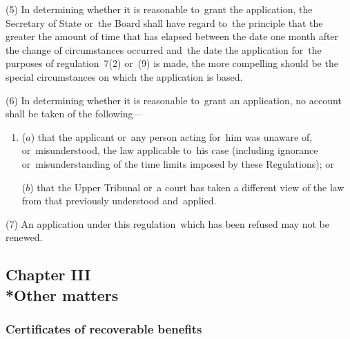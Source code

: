 \documentclass[12pt,a4paper]{article}
\begin{document}
(5) In determining whether it is reasonable to~grant the application, the Secretary of State 
or~the Board  %
shall have regard to~the principle that the greater the amount of time that has elapsed between the date one month after the change of circumstances occurred and~the date the application for~the purposes of regulation~7(2) 
or~(9)  %
is made, the more compelling should be the special circumstances on which the application is based.

(6) In determining whether it is reasonable to~grant an application, no account shall be taken of the following—
\begin{enumerate}\item[]
($a$) that the applicant or~any person acting for~him was unaware of, or~misunderstood, the law applicable to~his case (including ignorance or~misunderstanding of the time limits imposed by these Regulations); or

($b$) that 
the Upper Tribunal  %
or~a court has taken a different view of the law from that previously understood and~applied.
\end{enumerate}

(7) An application under this regulation~which has been refused may not be renewed.


\subsection[Chapter III --- Other matters]{Chapter III\\*Other matters}

\subsubsection[9. Certificates of recoverable benefits]{Certificates of recoverable benefits}
\end{document}

